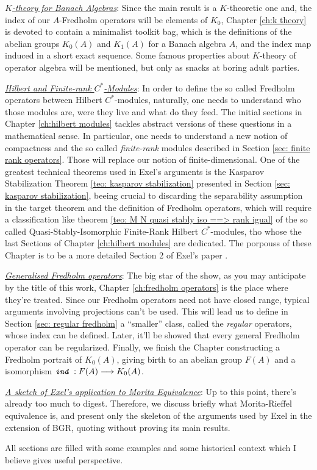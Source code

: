 \begin{itroman}
	\item \underline{\textit{$K$-theory for Banach Algebras}}: Since the main result is a $K$-theoretic one and, the index of our $A$-Fredholm operators will be elements of $K_0$, Chapter \ref{ch:k theory} is devoted to contain a minimalist toolkit bag, which is the definitions of the abelian groups $K_0(A)$ and $K_1(A)$ for a Banach algebra $A$, and the index map induced in a short exact sequence. Some famous properties about $K$-theory of operator algebra will be mentioned, but only as snacks at boring adult parties.
	\item \underline{\textit{Hilbert and Finite-rank \ensuremath{C^*}-Modules}}: In order to define the so called Fredholm operators between Hilbert $C^*$-modules, naturally, one needs to understand who those modules are, were they live and what do they feed. The initial sections in Chapter \ref{ch:hilbert modules} tackles abstract versions of these questions in a mathematical sense. In particular, one needs to understand a new notion of compactness and the so called \textit{finite-rank} modules described in Section \ref{sec: finite rank operators}. Those will replace our notion of finite-dimensional. One of the greatest technical theorems used in Exel's arguments is the Kasparov Stabilization Theorem \ref{teo: kasparov stabilization} presented in Section \ref{sec: kasparov stabilization}, beeing crucial to discarding the separability assumption in the target theorem and the definition of Fredholm operators, which will require a classification like theorem \ref{teo: M N quasi stably iso ==> rank igual} of the so called Quasi-Stably-Isomorphic Finite-Rank Hilbert $C^*$-modules, tho whose the last Sections of Chapter \ref{ch:hilbert modules} are dedicated. The porpouss of these Chapter is to be a more detailed Section 2 of Exel's paper \cite{exel7fredholm}.
	
	\item \underline{\textit{Generalised Fredholm operators}}: The big star of the show, as you may anticipate by the title of this work, Chapter \ref{ch:fredholm operators} is the place where they're treated. Since our Fredholm operators need not have closed range, typical arguments involving projections can't be used. This will lead us to define in Section \ref{sec: regular fredholm} a ``smaller'' class, called the \textit{regular} operators, whose index can be defined. Later, it'll be showed that every general Fredholm operator can be regularized. Finally, we finish the Chapter constructing a Fredholm portrait of $K_0(A)$, giving birth to an abelian group $F(A)$ and a isomorphism $\texttt{\textit{ind}}\, : F(A) \longrightarrow K_0(A)$.
	
	\item \underline{\textit{A sketch of Exel's application to Morita Equivalence}}: Up to this point, there's already too much to digest. Therefore, we discuss briefly what Morita-Rieffel equivalence is, and present only the skeleton of the arguments used by Exel in the extension of BGR, quoting without proving its main results.      
\end{itroman}

All sections are filled with some examples and some historical context which I believe gives useful perspective. 

